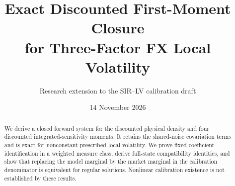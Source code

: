 \documentclass[11pt,a4paper]{article}
\title{Exact Discounted First-Moment Closure\\for Three-Factor FX Local Volatility}
\author{Research extension to the SIR--LV calibration draft}
\date{14 November 2026}
\begin{document}
\maketitle
\begin{abstract}
We derive a closed forward system for the discounted physical density and
four discounted integrated-sensitivity moments. It retains the shared-noise
covariation terms and is exact for nonconstant prescribed local volatility.
We prove fixed-coefficient identification in a weighted measure class,
derive full-state compatibility identities, and show that replacing the
model marginal by the market marginal in the calibration denominator is
equivalent for regular solutions. Nonlinear calibration existence is not
established by these results.
\end{abstract}
\setcounter{section}{1}

\end{document}
